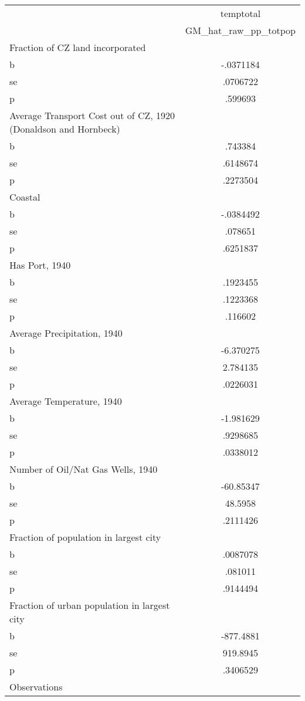 \begin{tabular}{l*{1}{c}}
\toprule
                &temptotal\\
                &GM\_hat\_raw\_pp\_totpop\\
\midrule
Fraction of CZ land incorporated&         \\
b               &-.0371184\\
se              & .0706722\\
p               &  .599693\\
\midrule
Average Transport Cost out of CZ, 1920 (Donaldson and Hornbeck)&         \\
b               &  .743384\\
se              & .6148674\\
p               & .2273504\\
\midrule
Coastal         &         \\
b               &-.0384492\\
se              &  .078651\\
p               & .6251837\\
\midrule
Has Port, 1940  &         \\
b               & .1923455\\
se              & .1223368\\
p               &  .116602\\
\midrule
Average Precipitation, 1940&         \\
b               &-6.370275\\
se              & 2.784135\\
p               & .0226031\\
\midrule
Average Temperature, 1940&         \\
b               &-1.981629\\
se              & .9298685\\
p               & .0338012\\
\midrule
Number of Oil/Nat Gas Wells, 1940&         \\
b               &-60.85347\\
se              &  48.5958\\
p               & .2111426\\
\midrule
Fraction of population in largest city&         \\
b               & .0087078\\
se              &  .081011\\
p               & .9144494\\
\midrule
Fraction of urban population in largest city&         \\
b               &-877.4881\\
se              & 919.8945\\
p               & .3406529\\
\midrule
Observations    &         \\
\bottomrule
\end{tabular}
